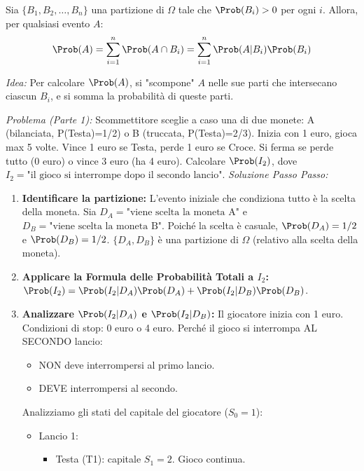 \begin{theorem}
Sia $\{B_1, B_2, \dots, B_n\}$ una partizione di $\Omega$ tale che $\Prob(B_i) > 0$ per ogni $i$. Allora, per qualsiasi evento $A$:
\[ \Prob(A) = \sum_{i=1}^n \Prob(A \cap B_i) = \sum_{i=1}^n \Prob(A|B_i) \Prob(B_i) \]
\end{theorem}
\textit{Idea:} Per calcolare $\Prob(A)$, si "scompone" $A$ nelle sue parti che intersecano ciascun $B_i$, e si somma la probabilità di queste parti.

\begin{example}
\textit{Problema (Parte 1):} Scommettitore sceglie a caso una di due monete: A (bilanciata, P(Testa)=1/2) o B (truccata, P(Testa)=2/3). Inizia con 1 euro, gioca max 5 volte. Vince 1 euro se Testa, perde 1 euro se Croce. Si ferma se perde tutto (0 euro) o vince 3 euro (ha 4 euro).
Calcolare $\Prob(I_2)$, dove $I_2 = \text{"il gioco si interrompe dopo il secondo lancio"}$.
\textit{Soluzione Passo Passo:}
\begin{enumerate}
    \item \textbf{Identificare la partizione:} L'evento iniziale che condiziona tutto è la scelta della moneta.
    Sia $D_A = \text{"viene scelta la moneta A"}$ e $D_B = \text{"viene scelta la moneta B"}$.
    Poiché la scelta è casuale, $\Prob(D_A) = 1/2$ e $\Prob(D_B) = 1/2$.
    $\{D_A, D_B\}$ è una partizione di $\Omega$ (relativo alla scelta della moneta).
    \item \textbf{Applicare la Formula delle Probabilità Totali a $I_2$:}
    $\Prob(I_2) = \Prob(I_2|D_A)\Prob(D_A) + \Prob(I_2|D_B)\Prob(D_B)$.
    \item \textbf{Analizzare $\Prob(I_2|D_A)$ e $\Prob(I_2|D_B)$:}
    Il giocatore inizia con 1 euro.
    Condizioni di stop: 0 euro o 4 euro.
    Perché il gioco si interrompa AL SECONDO lancio:
    \begin{itemize}
        \item NON deve interrompersi al primo lancio.
        \item DEVE interrompersi al secondo.
    \end{itemize}
    Analizziamo gli stati del capitale del giocatore ($S_0=1$):
    \begin{itemize}
        \item Lancio 1:
            \begin{itemize}
                \item Testa (T1): capitale $S_1=2$. Gioco continua.

\end{itemize}
\end{itemize}
\end{enumerate}
\end{example}
